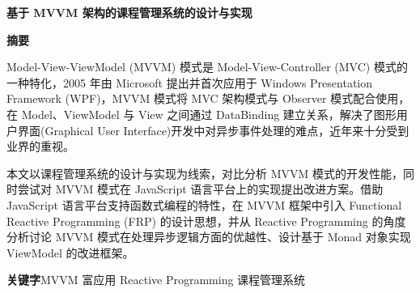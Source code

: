 \newpage
\begin{center}
	\heiti{}\textbf{基于 MVVM 架构的课程管理系统的设计与实现}
\end{center}
\begin{center}
	\heiti{}\textbf{摘\quad 要}
\end{center}
\vspace{2.5mm}
\songti{}

Model-View-ViewModel (MVVM) 模式是 Model-View-Controller (MVC) 模式的一种特化，2005 年由 Microsoft 提出并首次应用于 Windows Presentation Framework (WPF)，MVVM 模式将 MVC 架构模式与 Observer 模式配合使用，在 Model、ViewModel 与 View 之间通过 DataBinding 建立关系，解决了图形用户界面(Graphical User Interface)开发中对异步事件处理的难点，近年来十分受到业界的重视。

本文以课程管理系统的设计与实现为线索，对比分析 MVVM 模式的开发性能，同时尝试对 MVVM 模式在 JavaScript 语言平台上的实现提出改进方案。借助 JavaScript 语言平台支持函数式编程的特性，在 MVVM 框架中引入 Functional Reactive Programming (FRP) 的设计思想，并从 Reactive Programming 的角度分析讨论 MVVM 模式在处理异步逻辑方面的优越性、设计基于 Monad 对象实现 ViewModel 的改进框架。

\vspace{3mm}
\heiti\textbf{关键字}\quad \songti MVVM \quad 富应用 \quad Reactive Programming \quad 课程管理系统


